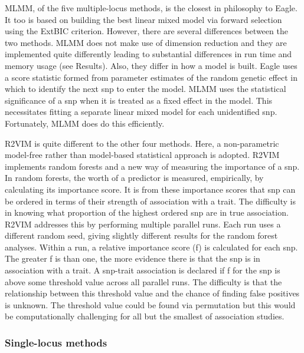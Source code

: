 \documentclass{nature}
\begin{document}
MLMM, of the five multiple-locus methods, is the closest in philosophy to Eagle. It too is based on  building the 
best  linear mixed model via forward selection using the ExtBIC criterion. 
However, there are several differences between the two methods.
 MLMM does not make use of dimension reduction and they are implemented quite differently leading to substantial 
 differences  in run time and memory usage (see Results).  Also, they differ in how a model is built. 
 Eagle uses a score statistic formed from parameter estimates of the random genetic effect in which to identify the next snp to enter 
 the model.  MLMM uses the statistical significance of a snp when it is treated as a fixed effect in the model. 
 This necessitates fitting a separate linear mixed model for each unidentified snp. Fortunately,  MLMM does do this 
 efficiently.
 
R2VIM is quite different to the other four methods. Here, a non-parametric model-free rather than model-based statistical approach is adopted. 
R2VIM implements random forests and a new way of measuring the importance of a snp.  
In random forests, the worth of a predictor is measured, empirically, by calculating its importance score. 
It is from these importance scores that snp can be ordered in terms of their strength of association with a trait. 
The difficulty is in knowing what proportion of the 
highest ordered snp are in true association. R2VIM addresses this by performing multiple parallel runs. Each run uses a different 
random seed, giving slightly different results for the random forest analyses. Within a run, a relative importance score (f) is calculated for 
each snp. The greater f is than one, the more evidence there is that the snp is in association with a trait.  A snp-trait association is 
declared if f for the snp is above some threshold value across all parallel runs. The difficulty is that the relationship between 
this threshold value and the chance of finding false positives is unknown.  The threshold value could be found via permutation but 
this would be computationally challenging for all but the smallest of association studies. 


\subsubsection{Single-locus methods}
\end{document}
